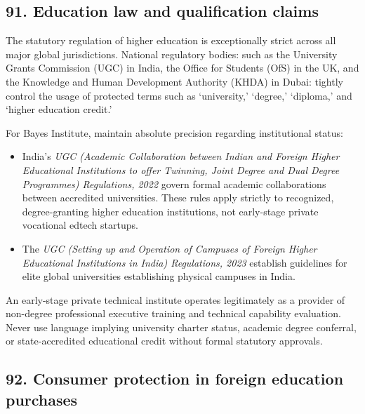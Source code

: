 \subsection{91. Education law and qualification claims}

The statutory regulation of higher education is exceptionally strict across all major global jurisdictions. National regulatory bodies: such as the University Grants Commission (UGC) in India, the Office for Students (OfS) in the UK, and the Knowledge and Human Development Authority (KHDA) in Dubai: tightly control the usage of protected terms such as `university,' `degree,' `diploma,' and `higher education credit.'

For Bayes Institute, maintain absolute precision regarding institutional status:
\begin{itemize}
    \item India's \textit{UGC (Academic Collaboration between Indian and Foreign Higher Educational Institutions to offer Twinning, Joint Degree and Dual Degree Programmes) Regulations, 2022} govern formal academic collaborations between accredited universities. These rules apply strictly to recognized, degree-granting higher education institutions, not early-stage private vocational edtech startups.
    \item The \textit{UGC (Setting up and Operation of Campuses of Foreign Higher Educational Institutions in India) Regulations, 2023} establish guidelines for elite global universities establishing physical campuses in India.
\end{itemize}
An early-stage private technical institute operates legitimately as a provider of non-degree professional executive training and technical capability evaluation. Never use language implying university charter status, academic degree conferral, or state-accredited educational credit without formal statutory approvals.

\subsection{92. Consumer protection in foreign education purchases}

